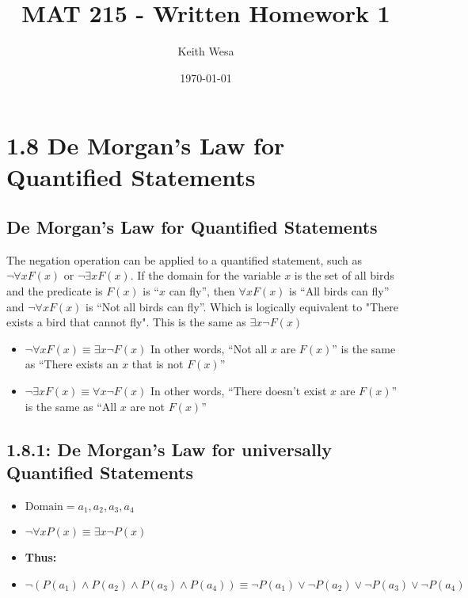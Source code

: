 \documentclass{article}
\author{Keith Wesa}
\title{MAT 215 - Written Homework 1}
\date{\today}
\begin{document}
\section*{1.8 De Morgan's Law for Quantified Statements}
\subsection*{De Morgan's Law for Quantified Statements}
The negation operation can be applied to a quantified statement, such as $\neg \forall x F(x)$ or $\neg \exists x F(x)$. If 
the domain for the variable $x$ is the set of all birds and the predicate is $F(x)$ is ``$x$ can fly'', then $\forall x F(x)$ is 
``All birds can fly'' and $\neg \forall x F(x)$ is ``Not all birds can fly''. Which is logically equivalent to "There exists a bird 
that cannot fly". This is the same as $\exists x \neg F(x)$
\begin{itemize}
    \item $\neg \forall x F(x) \equiv \exists x \neg F(x)$ In other words, ``Not all $x$ are $F(x)$'' is the same as ``There exists an $x$ that is not $F(x)$''
    \item $\neg \exists x F(x) \equiv \forall x \neg F(x)$ In other words, ``There doesn't exist $x$ are $F(x)$'' is the same as ``All $x$ are not $F(x)$''
\end{itemize}
\subsection*{1.8.1: De Morgan's Law for universally Quantified Statements}
\begin{itemize}
    \item[] $\text{Domain} = {a_1, a_2, a_3, a_4}$
    \item[] $\neg \forall x P(x) \equiv \exists x \neg P(x)$
    \item[] \textbf{Thus:}
    \item[] $\neg(P(a_1) \land P(a_2) \land P(a_3) \land P(a_4)) \equiv \neg P(a_1) \lor \neg P(a_2) \lor \neg P(a_3) \lor \neg P(a_4)$
\end{itemize}
\end{document}
